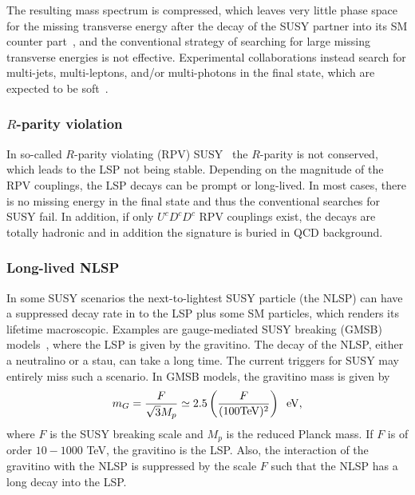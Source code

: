\documentclass[10pt]{article}
\begin{document}
The resulting mass spectrum is compressed, which leaves very little phase space for the missing transverse energy after the decay of the SUSY partner into its SM counter part~\cite{Fan:2011yu}, and the conventional strategy of searching for large missing transverse energies is not effective.
Experimental collaborations instead search for multi-jets, multi-leptons,  and/or multi-photons in the final state, which are expected to be soft~\cite{CMS:2014exa}.


\subsubsection[$R$-parity violation]{\boldmath $R$-parity violation}
%
In so-called $R$-parity violating (RPV) SUSY~\cite{Dreiner:2020qbi} the $R$-parity is not conserved, which leads to the LSP not being stable.
Depending on the magnitude of the RPV couplings, the LSP decays can be prompt or long-lived. 
In most cases, there is no missing energy in the final state and thus the conventional searches for SUSY fail.  
In addition, if only $U^c D^c D^c$ RPV couplings exist, the decays are totally hadronic and in addition the signature is buried in QCD background. 

\subsubsection{Long-lived NLSP}  
%
In some SUSY scenarios the next-to-lightest SUSY particle (the NLSP) can have a suppressed decay rate in to the LSP plus some SM particles, which renders its lifetime macroscopic. 
Examples are gauge-mediated SUSY breaking (GMSB) models~\cite{Dimopoulos:1996vz,Giudice:1998bp,Feng:1997zr}, where the LSP is given by the gravitino. The decay of the NLSP, either a neutralino or a stau, can take a long time. The current triggers for SUSY may entirely miss such a scenario. In GMSB models, the gravitino mass is given by~\cite{Dimopoulos:1996yq}
%
\begin{equation}
m_G = \frac{F}{\sqrt{3} M_p} \simeq  2.5 \left( \frac{F}{ (100 {\rm TeV})^2 } \right) \;\; {\rm eV},
\end{equation}
%
where $F$ is the SUSY breaking scale and $M_p$ is the reduced Planck mass. If $F$ is of order $10-1000$ TeV, the gravitino is the LSP. Also, the interaction of the gravitino with the NLSP is suppressed by the scale $F$ such that the NLSP has a long decay into the LSP. 
\end{document}

